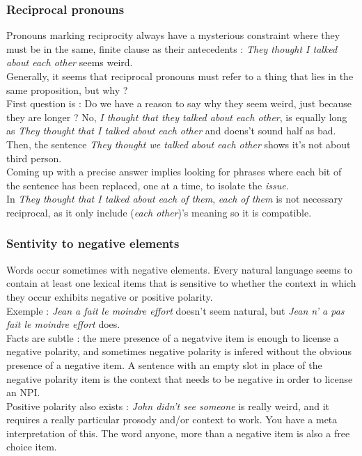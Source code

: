 \documentclass{cours}
\begin{document}
\subsubsection{Reciprocal pronouns}
Pronouns marking reciprocity always have a mysterious constraint where they must be in the same, finite clause as their antecedents\! : \textsl{They thought I talked about each other} seems weird.\\
Generally, it seems that reciprocal pronouns must refer to a thing that lies in the same proposition, but why ? \\
First question is\! : Do we have a reason to say why they seem weird, just because they are longer ? No, \textsl{I thought that they talked about each other}, is equally long as \textsl{They thought that I talked about each other} and doens't sound half as bad. \\
Then, the sentence \textsl{They thought we talked about each other} shows it's not about third person. \\
Coming up with a precise answer implies looking for phrases where each bit of the sentence has been replaced, one at a time, to isolate the \textit{issue}.\\
In \textsl{They thought that I talked about each of them}, \textsl{each of them} is not necessary reciprocal, as it only include (\textsl{each other})'s meaning so it is compatible. 

\subsubsection{Sentivity to negative elements}
Words occur sometimes with negative elements. Every natural language seems to contain at least one lexical items that is sensitive to whether the context in which they occur exhibits negative or positive polarity.\\
Exemple\! : \textsl{Jean a fait le moindre effort} doesn't seem natural, but \textsl{Jean \emph{n'} a \emph{pas} fait le moindre effort} does.\\
Facts are subtle\! : the mere presence of a negatvive item is enough to license a negative polarity, and sometimes negative polarity is infered without the obvious presence of a negative item. A sentence with an empty slot in place of the negative polarity item is the context that needs to be negative in order to license an NPI. \\
Positive polarity also exists\! : \textsl{John didn't see someone} is really weird, and it requires a really particular prosody and/or context to work. You have a meta interpretation of this. The word anyone, more than a negative item is also a free choice item. 
\end{document}
